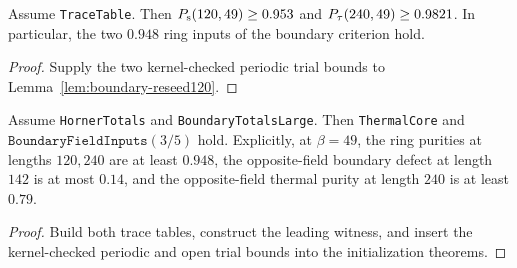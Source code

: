 \begin{lemma}
  \label{lem:kernel-reseed120}
  \leanok
  Assume \texttt{TraceTable}. Then
  \(P_{\mathrm{s}}(120,49)\ge0.953\) and \(P_{\tau}(240,49)\ge0.9821\).
  In particular, the two \(0.948\) ring inputs of the boundary criterion hold.
\end{lemma}
\begin{proof}
  \leanok
  Supply the two kernel-checked periodic trial bounds to Lemma~\ref{lem:boundary-reseed120}.
\end{proof}

\begin{theorem}
  \label{thm:kernel-boundary-inputs}
  \leanok
  Assume \texttt{HornerTotals} and \texttt{BoundaryTotalsLarge}.
  Then \texttt{ThermalCore} and \(\texttt{BoundaryFieldInputs}(3/5)\) hold.
  Explicitly, at \(\beta=49\), the ring purities at lengths \(120,240\) are at least \(0.948\),
  the opposite-field boundary defect at length \(142\) is at most \(0.14\), and the
  opposite-field thermal purity at length \(240\) is at least \(0.79\).
\end{theorem}
\begin{proof}
  \leanok
  Build both trace tables, construct the leading witness, and insert the kernel-checked periodic
  and open trial bounds into the initialization theorems.
\end{proof}

